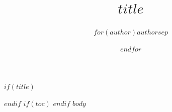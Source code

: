 \documentclass[UTF8,fontset=fandol,zihao=-4,oneside,openany]{ctexbook}
\title{$title$}
\author{$for(author)$$author$$sep$ \and $endfor$}
\author{}
\date{}
\begin{document}
\frontmatter
$if(title)$
\maketitle
$endif$
$if(toc)$
\renewcommand*\contentsname{$if(toc-title)$$toc-title$$else$目录$endif$}
{
\setcounter{tocdepth}{$if(toc-depth)$$toc-depth$$else$2$endif$}
\tableofcontents
}
$endif$
\mainmatter
$body$
\end{document}
